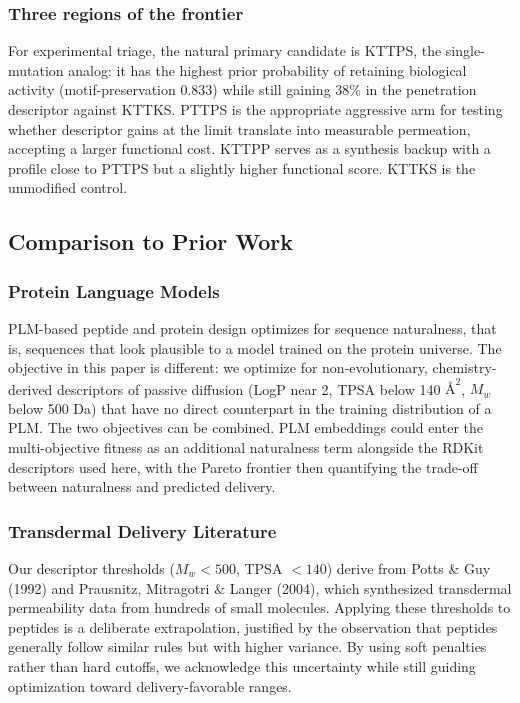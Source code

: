 \documentclass[11pt,letterpaper]{article}
\begin{document}
\subsubsection{Three regions of the frontier}

For experimental triage, the natural primary candidate is KTTPS, the single-mutation analog: it has the highest prior probability of retaining biological activity (motif-preservation 0.833) while still gaining 38\% in the penetration descriptor against KTTKS. PTTPS is the appropriate aggressive arm for testing whether descriptor gains at the limit translate into measurable permeation, accepting a larger functional cost. KTTPP serves as a synthesis backup with a profile close to PTTPS but a slightly higher functional score. KTTKS is the unmodified control.

\subsection{Comparison to Prior Work}

\subsubsection{Protein Language Models}

PLM-based peptide and protein design\cite{madani2023} optimizes for sequence naturalness, that is, sequences that look plausible to a model trained on the protein universe. The objective in this paper is different: we optimize for non-evolutionary, chemistry-derived descriptors of passive diffusion (LogP near 2, TPSA below 140 $\text{\AA}^2$, $M_w$ below 500 Da) that have no direct counterpart in the training distribution of a PLM. The two objectives can be combined. PLM embeddings could enter the multi-objective fitness as an additional naturalness term alongside the RDKit descriptors used here, with the Pareto frontier then quantifying the trade-off between naturalness and predicted delivery.

\subsubsection{Transdermal Delivery Literature}

Our descriptor thresholds ($M_w < 500$, TPSA $< 140$) derive from Potts \& Guy (1992)\cite{potts1992} and Prausnitz, Mitragotri \& Langer (2004)\cite{prausnitz2004}, which synthesized transdermal permeability data from hundreds of small molecules. Applying these thresholds to peptides is a deliberate extrapolation, justified by the observation that peptides generally follow similar rules but with higher variance\cite{mitragotri2014}. By using soft penalties rather than hard cutoffs, we acknowledge this uncertainty while still guiding optimization toward delivery-favorable ranges.
\end{document}
